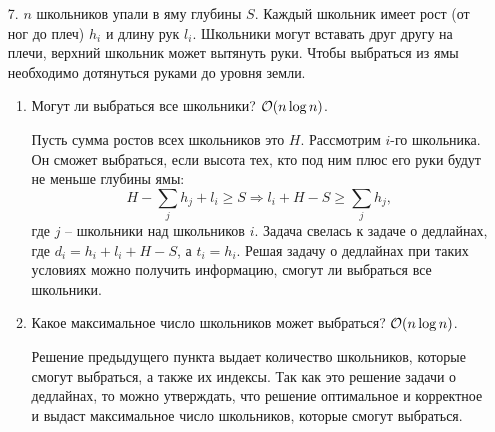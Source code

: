 \begin{enumerate}

  \item[7.]
	$n$ школьников упали в яму глубины $S$. Каждый школьник имеет рост (от ног до плеч) $h_i$
	и длину рук $l_i$. Школьники могут вставать друг другу на плечи, верхний школьник может
	вытянуть руки. Чтобы выбраться из ямы необходимо дотянуться руками до уровня земли.
	\begin{enumerate}
		\item Могут ли выбраться все школьники? $\mathcal{O}(n \log n)$.
		\begin{solution}
      Пусть сумма ростов всех школьников это $H$. Рассмотрим $i$-го школьника. Он сможет выбраться, если высота тех, кто под ним плюс его руки будут не меньше глубины ямы:
      \begin{equation}
        H-\sum_{j}h_j + l_i \ge S \Rightarrow l_i+H-S\ge\sum_{j}h_j,
      \end{equation}
      где $j$ -- школьники над школьников $i$. Задача свелась к задаче о дедлайнах, где $d_i=h_i+l_i+H-S$, а $t_i=h_i$. Решая задачу о дедлайнах при таких условиях можно получить информацию, смогут ли выбраться все школьники.
    \end{solution}
		\item Какое максимальное число школьников может выбраться? $\mathcal{O}(n \log n)$.
		\begin{solution}
      Решение предыдущего пункта выдает количество школьников, которые смогут выбраться, а также их индексы. Так как это решение задачи о дедлайнах, то можно утверждать, что решение оптимальное и корректное и выдаст максимальное число школьников, которые смогут выбраться.
    \end{solution}
	\end{enumerate}


\end{enumerate}
